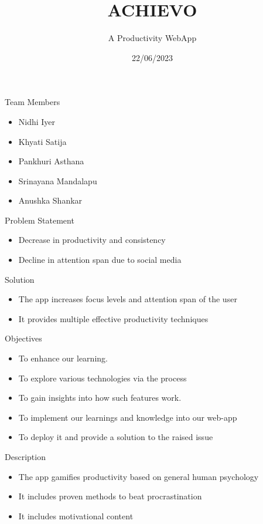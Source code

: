 \documentclass{beamer}
\title{ACHIEVO}
\subtitle{A Productivity WebApp}
\institute[Program]{
	\inst{Women Engineers}
	\inst{TalentSprint}
}
\date{22/06/2023}
\begin{document}
	
	\maketitle
	\begin{frame}{Team Members}
		\begin{itemize}
		\item Nidhi Iyer
		\item Khyati Satija
		\item Pankhuri Asthana
		\item Srinayana Mandalapu
		\item Anushka Shankar
		\end{itemize}
	\end{frame}

	

	\begin{frame}{Problem Statement}
		\justifying
		\begin{itemize}
		\item Decrease in productivity and consistency
	  \bigskip	\item Decline in attention span due to social media
		\end{itemize}
	\end{frame}

	\begin{frame}{Solution}
		\justifying
		\begin{itemize}
		\item The app increases focus levels and attention span of the user
  \bigskip
		\item It provides multiple effective productivity techniques  
		\end{itemize}
	\end{frame}

 \begin{frame}{Objectives}
                \begin{itemize}
                \item To enhance our learning.
                \item To explore various technologies via the process
                \item To gain insights into how such features work.
                \item To implement our learnings and knowledge into our web-app
                \item To deploy it and provide a solution to the raised issue
                \end{itemize}
        \end{frame}
	\begin{frame}{Description}
		\begin{itemize}
		\item The app gamifies productivity based on general human psychology
	  \bigskip	\item It includes proven methods to beat procrastination
		  \bigskip \item It includes motivational content
		\end{itemize}
	\end{frame}
\end{document}
